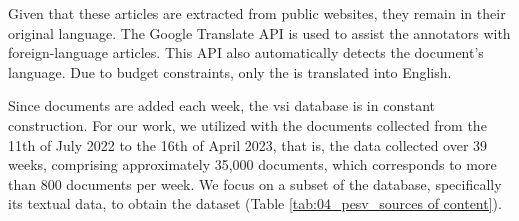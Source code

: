 Given that these articles are extracted from public websites, they remain in their original language. The Google Translate API is used to assist the annotators with foreign-language articles. This API also automatically detects the document's language.
Due to budget constraints, only the \trafilaturaTitle{} is translated into English.



Since documents are added each week, the \gls{vsi} database is in constant construction. 
For our work, we utilized with the documents collected from the 11th of July 2022 to the 16th of April 2023, that is, the data collected over 39 weeks, comprising approximately 35,000 documents, which corresponds to more than 800 documents per week. We focus on a subset of the \VSI{} database, specifically its textual data, to obtain the \VSI{} dataset  (Table \ref{tab:04_pesv_sources of content}).





\label{vsi_data_annotation}






